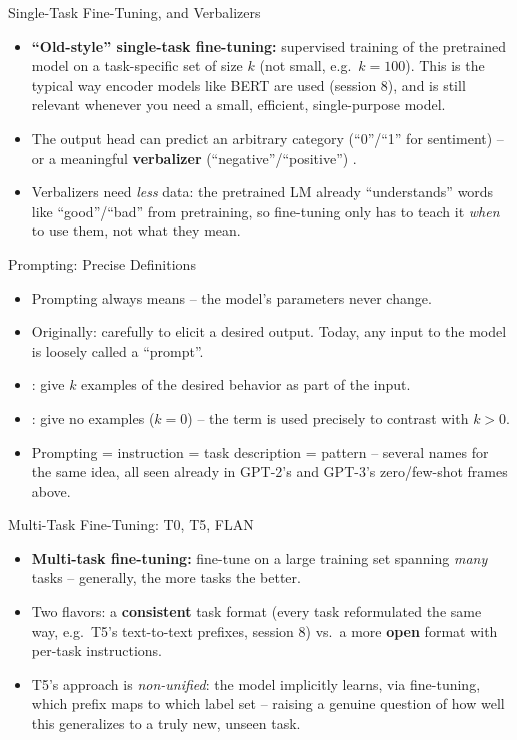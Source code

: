 \begin{vbframe}{Single-Task Fine-Tuning, and Verbalizers}
\begin{itemize}
  \item \textbf{``Old-style'' single-task fine-tuning:} supervised training of the pretrained model on a task-specific set of size $k$ (not small, e.g.\ $k=100$). This is the typical way encoder models like BERT are used (session 8), and is still relevant whenever you need a small, efficient, single-purpose model.
  \item The output head can predict an arbitrary category (``0''/``1'' for sentiment) -- or a meaningful \textbf{verbalizer} (``negative''/``positive'') .
  \item Verbalizers need \textit{less} data: the pretrained LM already ``understands'' words like ``good''/``bad'' from pretraining, so fine-tuning only has to teach it \textit{when} to use them, not what they mean.
\end{itemize}
\end{vbframe}

\begin{vbframe}{Prompting: Precise Definitions}
\begin{itemize}
  \item Prompting always means  -- the model's parameters never change.
  \item Originally: carefully  to elicit a desired output. Today, any input to the model is loosely called a ``prompt''.
  \item {}: give $k$ examples of the desired behavior as part of the input.
  \item {}: give no examples ($k=0$) -- the term is used precisely to contrast with $k>0$.
  \item Prompting = instruction = task description = pattern -- several names for the same idea, all seen already in GPT-2's and GPT-3's zero/few-shot frames above.
\end{itemize}
\end{vbframe}

\begin{vbframe}{Multi-Task Fine-Tuning: T0, T5, FLAN}
\begin{itemize}
  \item \textbf{Multi-task fine-tuning:} fine-tune on a large training set spanning \textit{many} tasks -- generally, the more tasks the better.
  \item Two flavors: a \textbf{consistent} task format (every task reformulated the same way, e.g.\ T5's text-to-text prefixes, session 8) vs.\ a more \textbf{open} format with per-task instructions.
  \item T5's approach is \textit{non-unified}: the model implicitly learns, via fine-tuning, which prefix maps to which label set -- raising a genuine question of how well this generalizes to a truly new, unseen task. 
\end{itemize}
\end{vbframe}

